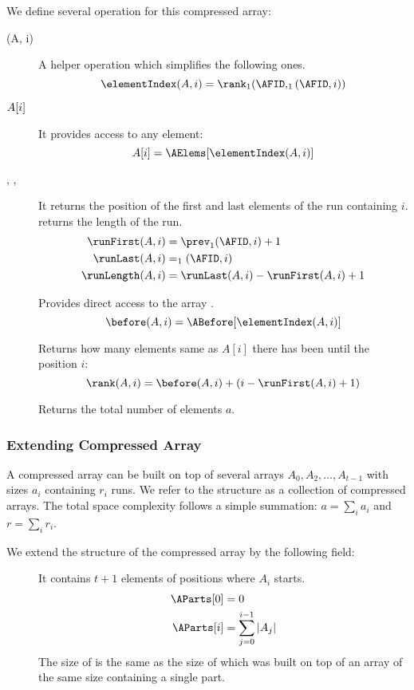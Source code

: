 We define several operation for this compressed array:
\begin{description}
	\item[\elementIndex(A, i)]
	A helper operation which simplifies the following ones.
	$$ \elementIndex(A, i) = \rank_1(\AFID, \succ_1(\AFID, i)) $$

	\item[$A[i\char93$]
	It provides access to any element:
	$$ A[i] = \AElems[\elementIndex(A, i)] $$

	\item[\runFirst{}, \runLast{}, \runLength{}]
	It returns the position of the first and last elements of the run containing $i$.
	\runLength{} returns the length of the run.
	\begin{align*}
		\runFirst(A, i) &= \prev_1(\AFID, i) + 1 \\
		\runLast(A, i) &= \succ_1(\AFID, i) \\
		\runLength(A, i) &= \runLast(A, i) - \runFirst(A, i) + 1
	\end{align*}
	
	\item[\before{}]
	Provides direct access to the array \ABefore{}.
	$$ \before(A, i) = \ABefore[\elementIndex(A, i)] $$
	
	\item[\rank{}]
	Returns how many elements same as $A[i]$ there has been until the position $i$:
	$$ \rank(A, i) = \before(A, i) + (i - \runFirst(A, i) + 1) $$
	
	\item[\size{}]
	Returns the total number of elements $a$.
\end{description}

\subsubsection{Extending Compressed Array}

A compressed array can be built on top of several arrays $A_0, A_2, \ldots, A_{t-1}$ with sizes $a_i$ containing $r_i$ runs.
We refer to the structure as a collection of compressed arrays.
The total space complexity follows a simple summation: $a = \sum_i a_i$ and $r = \sum_i r_i$.

We extend the structure of the compressed array by the following field:
\begin{description}
	\item[\AParts{}]
	It contains $t + 1$ elements of positions where $A_i$ starts.
	\begin{align*}
		\AParts[0] &= 0 \\
		\AParts[i] &= \sum_{j = 0}^{i - 1} |A_{j}|
	\end{align*}
	The size of \AParts{} is the same as the size of \ABefore{} which was built on top of an array of the same size containing a single part.
\end{description}

